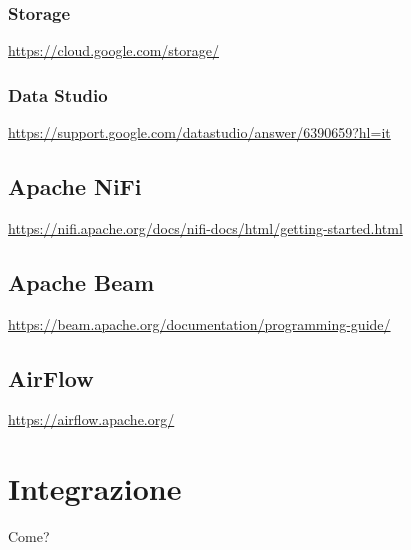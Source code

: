 \subsubsection{Storage}
\url{https://cloud.google.com/storage/}
\subsubsection{Data Studio}
\url{https://support.google.com/datastudio/answer/6390659?hl=it}
\subsection{Apache NiFi}
\url{https://nifi.apache.org/docs/nifi-docs/html/getting-started.html}
\subsection{Apache Beam}
\url{https://beam.apache.org/documentation/programming-guide/}
\subsection{AirFlow}
\url{https://airflow.apache.org/}\\
\section{Integrazione}
Come?

